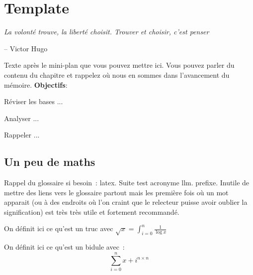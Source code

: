 \chapter{Template}
\label{chap:zero}

\epigraph{\itshape  La volonté trouve, la liberté choisit. Trouver et choisir, c'est penser}{-- Victor Hugo}

\startcontents[chapters]

\printMyMinitoc

Texte après le mini-plan que vous pouvez mettre ici. Vous pouvez parler du contenu du chapitre et rappelez où nous en sommes dans l'avancement du mémoire.\newline
{\noindent \color{colorEPISEN-MEMOIRE}\textbf{Objectifs}}:
\begin{itemizeEPISEN}
	\item Réviser les bases ...
	\item Analyser ... 
	\item Rappeler ...
\end{itemizeEPISEN}

\fancyhead[LE]{\textsc{\chaptername~\thechapter}}


\section{Un peu de maths}

Rappel du glossaire si besoin~: \Gls{latex}. Suite test acronyme llm. prefixe. Inutile de mettre des liens vers le glossaire partout mais les première fois où un mot apparait (ou à des endroits où l'on craint que le relecteur puisse avoir oublier la signification) est très très utile et fortement recommandé.


\begin{definition}[Un truc.]
On définit ici ce qu'est un truc avec $\sqrt{x}=\int_{i=0}^n \frac{1}{\log{x}}$
\end{definition}

\begin{definition}[Un bidule.]
On définit ici ce qu'est un bidule avec~:
\[
\sum_{i=0}^n x+i^{n \times n}
\]
\end{definition}

